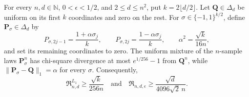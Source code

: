 For every \(n,d\in\mathbb N\), \(0<\epsilon<1/2\), and \(2\le d\le n^2\), put \(k=2\lfloor d/2\rfloor\).  Let \(\mathbf Q\in\Delta_d\) be uniform on its first \(k\) coordinates and zero on the rest.  For \(\sigma\in\{-1,1\}^{k/2}\), define \(\mathbf P_\sigma\in\Delta_d\) by
\[
 P_{\sigma,2j-1}=\frac{1+\alpha\sigma_j}{k},\qquad
 P_{\sigma,2j}=\frac{1-\alpha\sigma_j}{k},
 \qquad
 \alpha^2=\frac{\sqrt{k}}{16n},
\]
and set its remaining coordinates to zero.  The uniform mixture of the \(n\)-sample laws \(\mathbf P_\sigma^n\) has chi-square divergence at most \(e^{1/256}-1\) from \(\mathbf Q^n\), while \(\lVert\mathbf P_\sigma-\mathbf Q\rVert_1=\alpha\) for every \(\sigma\).  Consequently,
\[
 \mathfrak R^{L_1}_{n,d}\ge \frac{\sqrt{k}}{256n}
 \quad\text{and}\quad
 \mathfrak R_{n,d,\epsilon}
 \ge \frac{\sqrt d}{4096\sqrt2\,n}.
\]